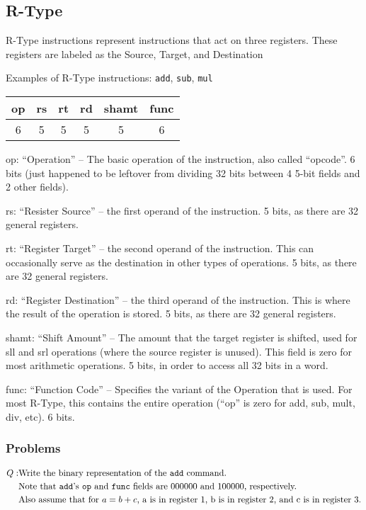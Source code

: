 \documentclass{article}
\begin{document}
\subsection{R-Type}\label{RType}
R-Type instructions represent instructions that act on three registers. These registers are labeled as the Source, Target, and Destination

Examples of R-Type instructions: \texttt{add}, \texttt{sub}, \texttt{mul}

\begin{tabular}{|c|c|c|c|c|c|}
    \hline
    op & rs & rt & rd & shamt & func \\
    \hline
    6 & 5 & 5 & 5 & 5 & 6 \\ 
    \hline
\end{tabular}

op: ``Operation'' -- The basic operation of the instruction, also called ``opcode''. 6 bits (just happened to be leftover from dividing 32 bits between 4 5-bit fields and 2 other fields).

rs: ``Resister Source'' -- the first operand of the instruction. 5 bits, as there are 32 general registers. 

rt: ``Register Target'' -- the second operand of the instruction. This can occasionally serve as the destination in other types of operations. 5 bits, as there are 32 general registers. 

rd: ``Register Destination'' -- the third operand of the instruction. This is where the result of the operation is stored. 5 bits, as there are 32 general registers. 

shamt: ``Shift Amount'' -- The amount that the target register is shifted, used for sll and srl operations (where the source register is unused). This field is zero for most arithmetic operations. 5 bits, in order to access all 32 bits in a word.

func: ``Function Code'' -- Specifies the variant of the Operation that is used. For most R-Type, this contains the entire operation (``op'' is zero for add, sub, mult, div, etc). 6 bits.

\subsubsection{Problems}\label{RTypeProblems}

\begin{equation}\label{RType1}
\begin{aligned}
    Q: & \text{Write the binary representation of the \texttt{add} command.}\\
    & \text{Note that \texttt{add}'s \texttt{op} and \texttt{func} fields are 000000 and 100000, respectively.}\\
    & \text{Also assume that for } a = b + c \text{, a is in register 1, b is in register 2, and c is in register 3.}
\end{aligned}
\end{equation}
\end{document}

